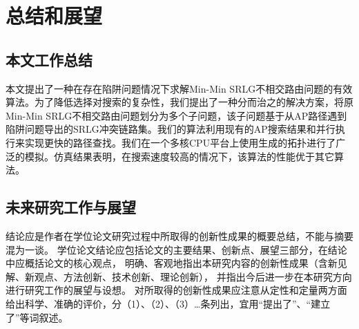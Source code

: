 
\chapter{总结和展望}
\section{本文工作总结}
本文提出了一种在存在陷阱问题情况下求解Min-Min SRLG不相交路由问题的有效算法。为了降低选择对搜索的复杂性，我们提出了一种分而治之的解决方案，将原Min-Min SRLG不相交路由问题划分为多个子问题，该子问题基于从AP路径遇到陷阱问题导出的SRLG冲突链路集。我们的算法利用现有的AP搜索结果和并行执行来实现更快的路径查找。我们在一个多核CPU平台上使用生成的拓扑进行了广泛的模拟。仿真结果表明，在搜索速度较高的情况下，该算法的性能优于其它算法。
\section{未来研究工作与展望}

结论应是作者在学位论文研究过程中所取得的创新性成果的概要总结，不能与摘要混为一谈。
学位论文结论应包括论文的主要结果、创新点、展望三部分，在结论中应概括论文的核心观点，
明确、客观地指出本研究内容的创新性成果（含新见解、新观点、方法创新、技术创新、理论创新），
并指出今后进一步在本研究方向进行研究工作的展望与设想。
对所取得的创新性成果应注意从定性和定量两方面给出科学、准确的评价，分（1）、（2）、（3）…条列出，宜用“提出了”、“建立了”等词叙述。